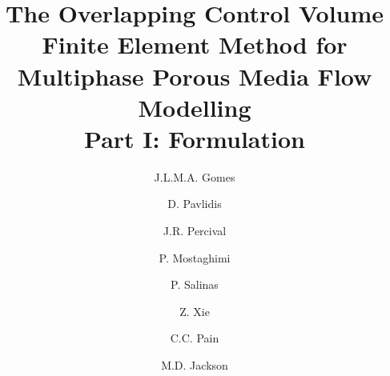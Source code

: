 \documentclass[preprint,authoryear,12pt]{elsarticle}
\begin{document}
\begin{frontmatter}



\title{The Overlapping Control Volume Finite Element Method for Multiphase Porous Media Flow Modelling \\
Part I: Formulation}

\author[UoA]{J.L.M.A. Gomes} \author[IC]{D. Pavlidis} 
\author[IC]{J.R. Percival} \author[NSW]{P. Mostaghimi} \author[IC,NORMS]{P. Salinas} \author[IC]{Z. Xie} 
\author[IC]{C.C. Pain} \author[NORMS]{M.D. Jackson}

\address[UoA]{Environmental and Industrial Fluid Mechanics Group, School of Engineering, University of Aberdeen, UK}
\address[IC]{Applied Modelling and Computation Group, Department of Earth Science and Engineering, Imperial College London, UK}
\address[NSW]{School of Petroleum Engineering, University of New South Wales, Australia}
\address[NORMS]{Novel Reservoir Modelling and Simulation Group, Department of Earth Science and Engineering, Imperial College London, UK}


\end{frontmatter}
\end{document}
